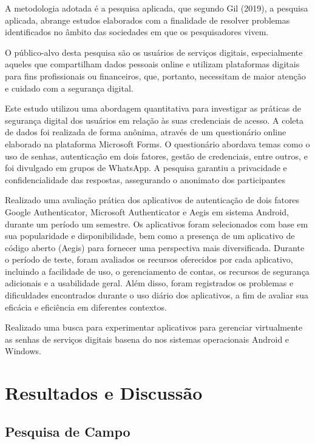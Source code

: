 \documentclass[12pt]{article}
\begin{document}
A metodologia adotada é a pesquisa aplicada, que segundo Gil (2019), a
pesquisa aplicada, abrange estudos elaborados com a finalidade de resolver
problemas identificados no âmbito das sociedades em que os pesquisadores
vivem.

O público-alvo desta pesquisa são os usuários de serviços digitais,
especialmente aqueles que compartilham dados pessoais online e utilizam
plataformas digitais para fins profissionais ou financeiros, que, portanto,
necessitam de maior atenção e cuidado com a segurança digital.


Este estudo utilizou uma abordagem quantitativa para investigar as práticas
de segurança digital dos usuários em relação às suas credenciais de acesso.
A coleta de dados foi realizada de forma anônima, através de um questionário
online elaborado na plataforma Microsoft Forms.
O questionário abordava temas como o uso de senhas, autenticação em dois
fatores, gestão de credenciais, entre outros, e foi divulgado em grupos de
WhatsApp.
A pesquisa garantiu a privacidade e
confidencialidade das respostas, assegurando o anonimato dos participantes

Realizado uma avaliação prática dos aplicativos de autenticação de dois
fatores Google Authenticator, Microsoft Authenticator e Aegis em sistema
Android, durante um período um semestre. Os aplicativos foram selecionados
com base em sua popularidade e disponibilidade, bem como a presença de um
aplicativo de código aberto (Aegis) para fornecer uma perspectiva mais
diversificada.
Durante o período de teste, foram avaliados os recursos oferecidos por cada
aplicativo, incluindo a facilidade de uso, o gerenciamento de contas, os
recursos de segurança adicionais e a usabilidade geral.
Além disso, foram registrados os problemas e dificuldades encontrados
durante o uso diário dos aplicativos, a fim de avaliar sua eficácia e
eficiência em diferentes contextos.

Realizado uma busca para experimentar aplicativos para gerenciar
virtualmente as senhas de serviços digitais basena do nos sistemas
operacionais Android e Windows.

\section{Resultados e Discussão}

\subsection{Pesquisa de Campo}
\end{document}
